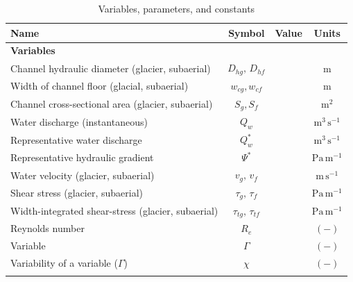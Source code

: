 \documentclass[11pt]{article}
\begin{document}
\begin{spacing}{1}
  \begin{table}[H]
    \centering
    \caption{Variables, parameters, and constants }
    \begin{tabular}{ l  c  c c }
      Name &Symbol&  Value&Units \\ \hline
      \textbf{Variables}  & & & \\
      Channel hydraulic diameter (glacier, subaerial) &  $D_{hg},\,D_{hf}$&  & $\mathrm{m}$     \\
      Width of channel floor (glacial, subaerial) & $w_{cg},w_{cf}$&  & $\mathrm{m}$     \\
      Channel cross-sectional area (glacier, subaerial) &  $S_g, S_f$& & $\mathrm{m^2}$     \\
      Water discharge (instantaneous) & $Q_w$& & $\mathrm{m^{3}\,s^{-1}}$ \\
      Representative water discharge & $Q_{w}^*$& & $\mathrm{m^{3}\,s^{-1}}$ \\
      Representative hydraulic gradient  &$\Psi^*$ & & $\mathrm{Pa\, m^{-1}}$\\
      Water velocity (glacier, subaerial)  & $v_g,\,v_{f}$& & $\mathrm{m\,s^{-1}}$ \\
      Shear stress (glacier, subaerial) & $\tau_g,\,\tau_f$&& $\mathrm{Pa \, m^{-1}}$ \\
      Width-integrated shear-stress (glacier, subaerial) & $\tau_{tg},\, \tau_{tf}$&& $\mathrm{Pa \, m^{-1}}$ \\
      Reynolds number &$R_e$& & $\mathrm{(-)}$\\
      Variable &$\Gamma$&&$\mathrm{(-)}$\\
      Variability of a variable ($\Gamma$) &$\chi$& &$\mathrm{(-)}$\\
           &&&\\
      

\end{tabular}
\end{table}
\end{spacing}
\end{document}
